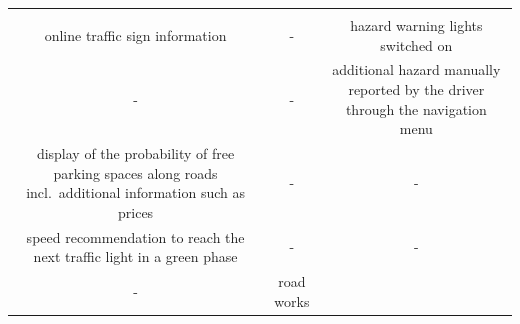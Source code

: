 \documentclass[
]{book}
\begin{document}
\begin{longtable}[]{@{}ccc@{}}
\begin{minipage}[t]{0.30\columnwidth}
\end{minipage}\tabularnewline
\begin{minipage}[t]{0.30\columnwidth}\centering
online traffic sign information\strut
\end{minipage} & \begin{minipage}[t]{0.30\columnwidth}\centering
-\strut
\end{minipage} & \begin{minipage}[t]{0.30\columnwidth}\centering
hazard warning lights switched on\strut
\end{minipage}\tabularnewline
\begin{minipage}[t]{0.30\columnwidth}\centering
-\strut
\end{minipage} & \begin{minipage}[t]{0.30\columnwidth}\centering
-\strut
\end{minipage} & \begin{minipage}[t]{0.30\columnwidth}\centering
additional hazard manually reported by the driver through the navigation menu\strut
\end{minipage}\tabularnewline
\begin{minipage}[t]{0.30\columnwidth}\centering
display of the probability of free parking spaces along roads incl.~additional information such as prices\strut
\end{minipage} & \begin{minipage}[t]{0.30\columnwidth}\centering
-\strut
\end{minipage} & \begin{minipage}[t]{0.30\columnwidth}\centering
-\strut
\end{minipage}\tabularnewline
\begin{minipage}[t]{0.30\columnwidth}\centering
speed recommendation to reach the next traffic light in a green phase\strut
\end{minipage} & \begin{minipage}[t]{0.30\columnwidth}\centering
-\strut
\end{minipage} & \begin{minipage}[t]{0.30\columnwidth}\centering
-\strut
\end{minipage}\tabularnewline
\begin{minipage}[t]{0.30\columnwidth}\centering
-\strut
\end{minipage} & \begin{minipage}[t]{0.30\columnwidth}\centering
road works\strut
\end{minipage} & \begin{minipage}[t]{0.30\columnwidth}\centering

\end{minipage}
\end{longtable}
\end{document}
